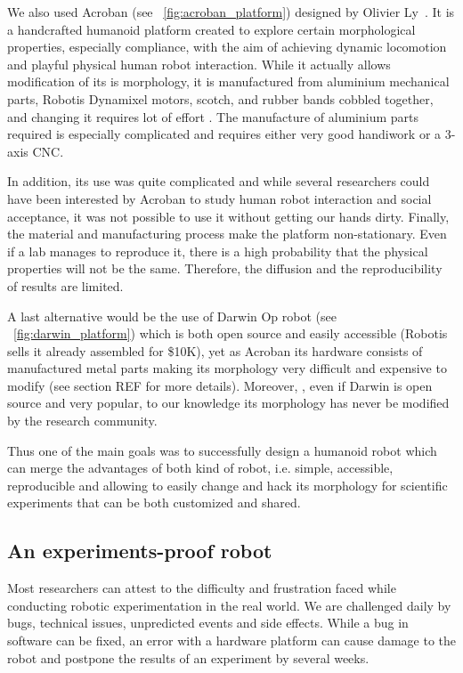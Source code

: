 We also used Acroban (see \figurename~\ref{fig:acroban_platform}) designed by Olivier Ly~\cite{Ly2010}. It is a handcrafted humanoid platform created to explore certain morphological properties, especially compliance, with the aim of achieving dynamic locomotion and playful physical human robot interaction.
While it actually allows modification of its is morphology, it is manufactured from aluminium mechanical parts, Robotis Dynamixel motors, scotch, and rubber bands cobbled together, and changing it requires lot of effort . The manufacture of aluminium parts required is especially complicated and requires either very good handiwork or a 3-axis CNC.

In addition, its use was quite complicated and while several researchers could have been interested by Acroban to study human robot interaction and social acceptance, it was not possible to use it without getting our hands dirty.
Finally, the material and manufacturing process make the platform non-stationary. Even if a lab manages to reproduce it, there is a high probability that the physical properties will not be the same. Therefore, the diffusion and the reproducibility of results are limited.


A last alternative would be the use of Darwin Op robot (see \figurename~\ref{fig:darwin_platform}) which is both open source and easily accessible (Robotis sells it already assembled for \$10K), yet as Acroban its hardware consists of manufactured metal parts making its morphology very difficult and expensive to modify (see section REF for more details). Moreover, , even if Darwin is open source and very popular, to our knowledge its morphology has never be modified by the research community.

Thus one of the main goals was to successfully design a humanoid robot which can merge the advantages of both kind of robot, i.e. simple, accessible, reproducible and allowing to easily change and hack its morphology for scientific experiments that can be both customized and shared.


\subsection{An experiments-proof robot} %

Most researchers can attest to the difficulty and frustration faced while conducting robotic experimentation in the real world. We are challenged daily by bugs, technical issues, unpredicted events and side effects. While a bug in software can be fixed, an error with a hardware platform can cause damage to the robot and postpone the results of an experiment by several weeks.

